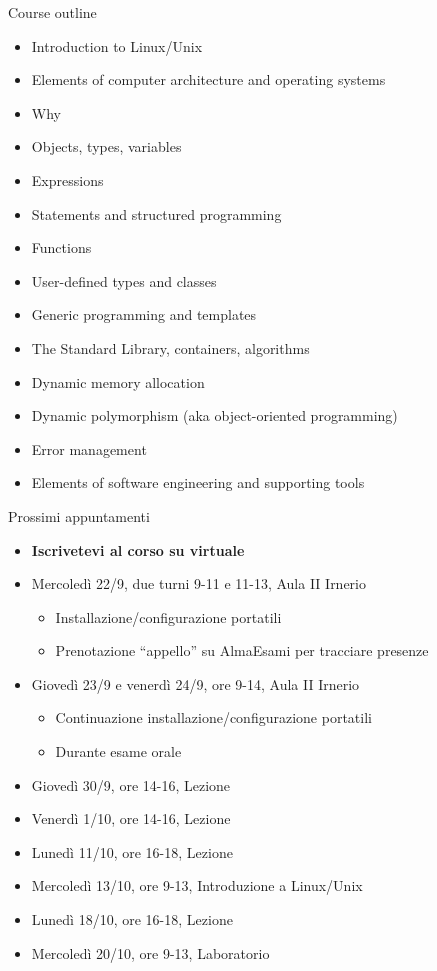 \begin{frame}{Course outline}
  \begin{itemize}
  \item<1-> Introduction to Linux/Unix
  \item<2-> Elements of computer architecture and operating systems
  \item<3-> Why \Cpp{}
  \item<4-> Objects, types, variables
  \item<4-> Expressions
  \item<4-> Statements and structured programming
  \item<4-> Functions
  \item<4-> User-defined types and classes
  \item<4-> Generic programming and templates
  \item<4-> The Standard Library, containers, algorithms
  \item<4-> Dynamic memory allocation
  \item<4-> Dynamic polymorphism (aka object-oriented programming)
  \item<4-> Error management
  \item<5-> Elements of software engineering and supporting tools
  \end{itemize}
\end{frame}

\begin{frame}{Prossimi appuntamenti}
  \begin{itemize}
  \item \textbf{Iscrivetevi al corso su virtuale}
  \item Mercoledì 22/9, due turni 9-11 e 11-13, Aula II Irnerio
    \begin{itemize}
    \item Installazione/configurazione portatili
    \item Prenotazione ``appello'' su AlmaEsami per tracciare presenze
    \end{itemize}

  \item Giovedì 23/9 e venerdì 24/9, ore 9-14, Aula II Irnerio
    \begin{itemize}
    \item Continuazione installazione/configurazione portatili
    \item Durante esame orale
    \end{itemize}

  \item Giovedì 30/9, ore 14-16, Lezione
  \item Venerdì 1/10, ore 14-16, Lezione
  \item Lunedì 11/10, ore 16-18, Lezione
  \item Mercoledì 13/10, ore 9-13, Introduzione a Linux/Unix
  \item Lunedì 18/10, ore 16-18, Lezione
  \item Mercoledì 20/10, ore 9-13, Laboratorio

  \end{itemize}
\end{frame}
